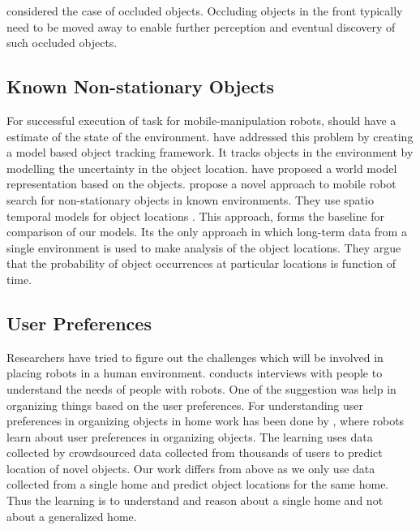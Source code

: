 \cite{wong_using_2014} considered the case of occluded objects. Occluding objects in the front typically need to be moved away to enable further perception and eventual discovery of such occluded objects. 

\subsection{Known Non-stationary Objects}
\label{sub:known non-stationary objects}
For successful execution of task for mobile-manipulation robots, should have a estimate of the state of the environment. \cite{elfring_semantic_2013} have addressed this problem by creating a model based object tracking framework. It tracks objects in the environment by modelling the uncertainty in the object location.
\cite{wong_manipulation-based_2013} have proposed a world model representation based on the objects. 
\cite{krajnik_wheres_2015}  propose a novel  approach  to  mobile  robot
search  for  non-stationary  objects  in known  environments. They use spatio temporal models for object locations .
This approach, forms the baseline for comparison of our models. Its the only approach in which long-term data from a single environment is used to make analysis of the object locations. They argue that the  probability of object occurrences at particular locations is function of time.



\subsection{User Preferences}
\label{sub:user preference}
Researchers have tried to figure out the challenges which will be involved in
placing robots in a human environment.\cite{pantofaru_exploring_2012} conducts
interviews with people to understand the needs of people with robots. One of the
suggestion was help in organizing things based on the user preferences.
For understanding user preferences in organizing objects in home work has 
been done by  \cite{abdo_collaborative_2014}, where robots learn about user
preferences in organizing objects. The learning uses data collected by 
crowdsourced data collected from thousands of users to predict location of 
novel objects. Our work differs from above as we only use data collected from a single home and predict object locations for the same home. Thus the learning is to understand and reason about a single home and not about a generalized home.


